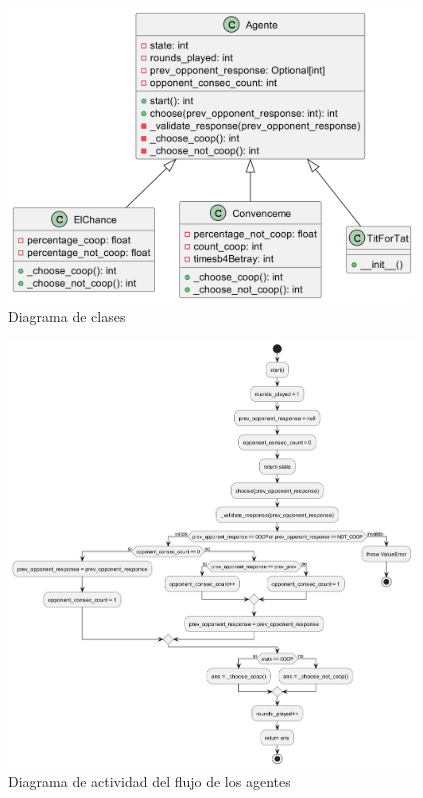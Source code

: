 \documentclass{article}
\begin{document}
\begin{figure}[H]        
  \centering             
  \includegraphics[width=0.96\textwidth]{diagrams/class_diag.png}
  \caption{Diagrama de clases}
  \label{fig:class_diag}
\end{figure}

\begin{figure}[H]        
  \centering             
  \includegraphics[width=0.96\textwidth]{diagrams/flow_diag.png}
  \caption{Diagrama de actividad del flujo de los agentes}
  \label{fig:flow_diag}
\end{figure}
\end{document}
